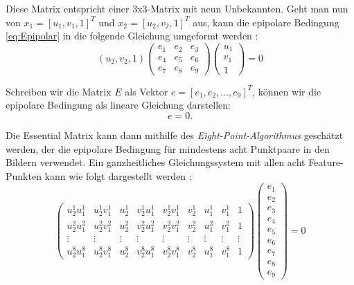 Diese Matrix entspricht einer 3x3-Matrix mit neun Unbekannten. Geht man nun von \( x_1 = [u_1, v_1, 1]^T \) und \( x_2 = [u_2, v_2, 1]^T \) aus, kann die epipolare Bedingung \ref{eq:Epipolar} in die folgende Gleichung umgeformt werden \cite{gao2021vSLAM}:
\begin{equation}
(u_2, v_2, 1) 
\begin{pmatrix}
    e_1 & e_2 & e_3 \\
    e_4 & e_5 & e_6 \\
    e_7 & e_8 & e_9
\end{pmatrix}
\begin{pmatrix}
    u_1 \\ v_1 \\ 1
\end{pmatrix}
= 0
\end{equation}

Schreiben wir die Matrix \( E \) als Vektor \( e = [e_1, e_2, \ldots, e_9]^T \), können wir die epipolare Bedingung als lineare Gleichung darstellen:
\begin{equation}
    [u_2u_1, u_2v_1, u_2, v_2u_1, v_2v_1, v_2, u_1, v_1, 1] e = 0.
\end{equation}

Die Essential Matrix kann dann mithilfe des \emph{Eight-Point-Algorithmus} geschätzt werden, der die epipolare Bedingung für mindestens acht Punktpaare in den Bildern verwendet. Ein ganzheitliches Gleichungssystem mit allen acht Feature-Punkten kann wie folgt dargestellt werden \cite{gao2021vSLAM, stachniss2020FandEmatrix, hartley1997eightpoint}:
\begin{equation}
    \begin{pmatrix}
        u_2^1 u_1^1 & u_2^1 v_1^1 & u_2^1 & v_2^1 u_1^1 & v_2^1 v_1^1 & v_2^1 & u_1^1 & v_1^1 & 1 \\
        u_2^2 u_1^2 & u_2^2 v_1^2 & u_2^2 & v_2^2 u_1^2 & v_2^2 v_1^2 & v_2^2 & u_1^2 & v_1^2 & 1 \\
        \vdots & \vdots & \vdots & \vdots & \vdots & \vdots & \vdots & \vdots & \vdots \\
        u_2^8 u_1^8 & u_2^8 v_1^8 & u_2^8 & v_2^8 u_1^8 & v_2^8 v_1^8 & v_2^8 & u_1^8 & v_1^8 & 1 
    \end{pmatrix}
    \begin{pmatrix}
        e_1 \\ e_2 \\ e_3 \\ e_4 \\ e_5 \\ e_6 \\ e_7 \\ e_8 \\ e_9
    \end{pmatrix}
    = 0
\end{equation}

